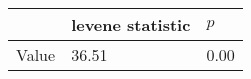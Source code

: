 \begin{tabular}{lll}
\toprule
 & levene statistic & $p$ \\
\midrule
Value & 36.51 & 0.00 \\
\bottomrule
\end{tabular}
